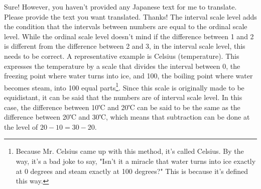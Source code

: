 \documentclass{ltjsbook}
\begin{document}
Sure! However, you haven't provided any Japanese text for me to translate. Please provide the text you want translated. Thanks!
The interval scale level adds the condition that the intervals between numbers are equal to the ordinal scale level. While the ordinal scale level doesn't mind if the difference between 1 and 2 is different from the difference between 2 and 3, in the interval scale level, this needs to be correct.
A representative example is Celsius (temperature). This expresses the temperature by a scale that divides the interval between 0, the freezing point where water turns into ice, and 100, the boiling point where water becomes steam, into 100 equal parts\footnote{Because Mr. Celsius came up with this method, it's called Celsius. By the way, it's a bad joke to say, "Isn't it a miracle that water turns into ice exactly at 0 degrees and steam exactly at 100 degrees?" This is because it's defined this way.}. Since this scale is originally made to be equidistant, it can be said that the numbers are of interval scale level. In this case, the difference between 10℃ and 20℃ can be said to be the same as the difference between 20℃ and 30℃, which means that subtraction can be done at the level of $20-10=30-20$.
\end{document}
